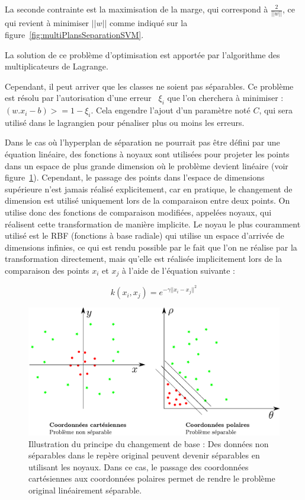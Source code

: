 La seconde contrainte est la maximisation de la marge, qui correspond à  $\frac{2}{||w||}$, ce qui revient à minimiser $||w||$ comme indiqué sur la figure~\ref{fig:multiPlansSeparationSVM}.

La solution de ce problème d'optimisation est apportée par l'algorithme des multiplicateurs de Lagrange. 

Cependant, il peut arriver que les classes ne soient pas séparables. Ce problème est résolu par l'autorisation d'une erreur~\cite{cortes1995support} $\xi_i$  que l'on cherchera à minimiser : $( w . x_i - b ) >= 1 - \xi_i $. Cela engendre l'ajout d'un paramètre noté $C$, qui sera utilisé dans le lagrangien pour pénaliser plus ou moins les erreurs.

Dans le cas où l'hyperplan de séparation ne pourrait pas être défini par une équation linéaire, des fonctions à noyaux sont utilisées pour projeter les points dans un espace de plus grande dimension où le problème devient linéaire (voir figure~\ref{fig:kernelTrick}). Cependant, le passage des points dans l'espace de dimensions supérieure n'est jamais réalisé explicitement, car en pratique, le changement de dimension est utilisé uniquement lors de la comparaison entre deux points. On utilise donc des fonctions de comparaison modifiées, appelées noyaux, qui réalisent cette transformation de manière implicite. Le noyau le plus couramment utilisé est le RBF (fonctions à base radiale) qui utilise un espace d'arrivée de dimensions infinies, ce qui est rendu possible par le fait que l'on ne réalise par la transformation directement, mais qu'elle est réalisée implicitement lors de la comparaison des points $x_i$ et $x_j$ à l'aide de l'équation suivante :

\begin{equation}
k(x_i,x_j)=e^{-\gamma||x_i-x_j||^2}  
\end{equation}

\begin{figure}[h]
	\begin{center}
	\includegraphics[width=15cm]{images/kernelTrick}
	\end{center}
	\caption[Changement de base pour les SVM]{Illustration du principe du changement de base : Des données non séparables dans le repère original peuvent devenir séparables en utilisant les noyaux. Dans ce cas, le passage des coordonnées cartésiennes aux coordonnées polaires permet de rendre le problème original linéairement séparable.}
	\label{fig:kernelTrick}
\end{figure}


